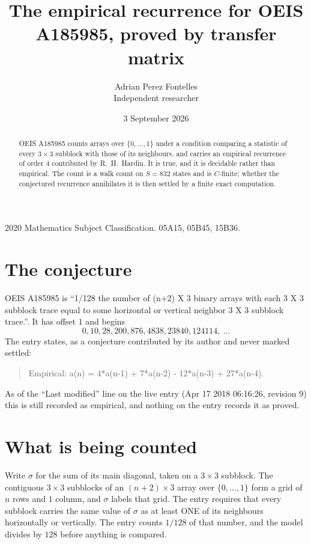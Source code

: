 \documentclass[11pt,a4paper]{article}
\title{The empirical recurrence for OEIS A185985, proved by transfer matrix}
\author{Adrian Perez Fontelles\\ \small Independent researcher}
\date{3 September 2026}
\theoremstyle{plain}
\theoremstyle{definition}
\begin{document}
\maketitle

\begin{abstract}
OEIS A185985 counts arrays over $\{0,\dots,1\}$ under a condition comparing a statistic of
every $3\times3$ subblock with those of its neighbours, and carries an empirical recurrence
of order $4$ contributed by R.~H.~Hardin. It is true, and it is decidable rather than
empirical. The count is a walk count on $S=832$ states and is $C$-finite; whether the
conjectured recurrence annihilates it is then settled by a finite exact computation.
\end{abstract}

\noindent\small 2020 Mathematics Subject Classification. 05A15, 05B45, 15B36.\normalsize

\section{The conjecture}

OEIS A185985 is ``1/128 the number of (n+2) X 3 binary arrays with each 3 X 3 subblock trace equal to some horizontal or vertical neighbor 3 X 3 subblock trace.''. It has offset $1$ and begins
\[
0, 10, 28, 200, 876, 4838, 23840, 124114,\ \dots
\]
The entry states, as a conjecture contributed by its author and never marked settled:
\begin{quote}
Empirical: a(n) = 4*a(n-1) + 7*a(n-2) - 12*a(n-3) + 27*a(n-4).
\end{quote}
As of the ``Last modified'' line on the live entry (Apr 17 2018 06:16:26, revision 9) this is still
recorded as empirical, and nothing on the entry records it as proved.

\section{What is being counted}

Write $\sigma$ for the sum of its main diagonal, taken on a $3\times3$ subblock. The contiguous $3\times3$
subblocks of an $(n+2)\times3$ array over $\{0,\dots,1\}$ form a grid of $n$ rows
and $1$ column, and $\sigma$ labels that grid. The entry
requires that every subblock carries the same value of $\sigma$ as at least ONE of its neighbours horizontally or vertically. The entry counts $1/128$ of that number, and the model divides by $128$ before anything is compared.
\end{document}
